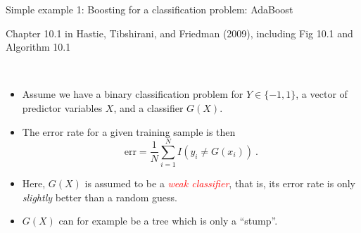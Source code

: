 \documentclass[
  10pt,
  ignorenonframetext,
]{beamer}
\providecommand{\tightlist}{%
  \setlength{\itemsep}{0pt}\setlength{\parskip}{0pt}}
\begin{document}
\begin{frame}
\begin{block}{Simple example 1: Boosting for a classification problem:
AdaBoost}
\protect\hypertarget{simple-example-1-boosting-for-a-classification-problem-adaboost}{}
\tiny

Chapter 10.1 in Hastie, Tibshirani, and Friedman (2009), including Fig
10.1 and Algorithm 10.1

\normalsize

\(~\)

\begin{itemize}
\tightlist
\item
  Assume we have a binary classification problem for \(Y\in \{-1,1\}\),
  a vector of predictor variables \(X\), and a classifier \(G(X)\).
\end{itemize}

\vspace{2mm}

\begin{itemize}
\tightlist
\item
  The error rate for a given training sample is then
  \[\text{err} =\frac{1}{N} \sum_{i=1}^N I(y_i \neq G(x_i)) \ .\]
\end{itemize}

\vspace{2mm}

\begin{itemize}
\tightlist
\item
  Here, \(G(X)\) is assumed to be a
  \emph{\textcolor{red}{weak classifier}}, that is, its error rate is
  only \emph{slightly} better than a random guess.
\end{itemize}

\vspace{2mm}

\begin{itemize}
\tightlist
\item
  \(G(X)\) can for example be a tree which is only a ``stump''.
\end{itemize}
\end{block}
\end{frame}
\end{document}
